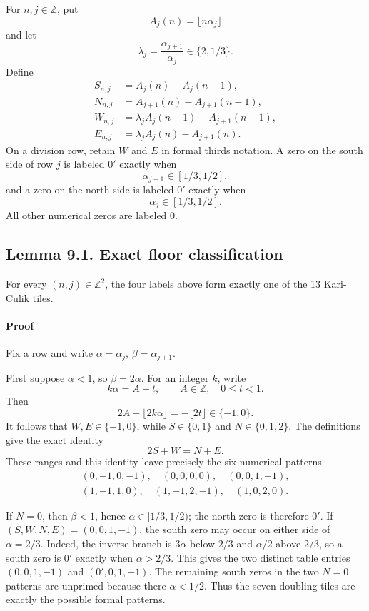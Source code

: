 \documentclass[11pt]{article}
\begin{document}
For \(n,j\in\mathbb Z\), put
\[
  A_j(n)=\lfloor n\alpha_j\rfloor
\]
and let
\[
  \lambda_j=\frac{\alpha_{j+1}}{\alpha_j}\in\{2,1/3\}.
\]
Define
\[
\begin{aligned}
S_{n,j}&=A_j(n)-A_j(n-1),\\
N_{n,j}&=A_{j+1}(n)-A_{j+1}(n-1),\\
W_{n,j}&=\lambda_jA_j(n-1)-A_{j+1}(n-1),\\
E_{n,j}&=\lambda_jA_j(n)-A_{j+1}(n).
\end{aligned}
\]
On a division row, retain \(W\) and \(E\) in formal thirds notation. A zero
on the south side of row \(j\) is labeled \(0'\) exactly when
\[
  \alpha_{j-1}\in[1/3,1/2],
\]
and a zero on the north side is labeled \(0'\) exactly when
\[
  \alpha_j\in[1/3,1/2].
\]
All other numerical zeros are labeled \(0\).

\subsection*{Lemma 9.1. Exact floor classification}

For every \((n,j)\in\mathbb Z^2\), the four labels above form exactly one of
the 13 Kari-Culik tiles.

\paragraph{Proof}

Fix a row and write \(\alpha=\alpha_j\),
\(\beta=\alpha_{j+1}\).

First suppose \(\alpha<1\), so \(\beta=2\alpha\). For an integer \(k\), write
\[
  k\alpha=A+t,\qquad A\in\mathbb Z,\quad 0\leq t<1.
\]
Then
\[
  2A-\lfloor2k\alpha\rfloor=-\lfloor2t\rfloor\in\{-1,0\}.
\]
It follows that \(W,E\in\{-1,0\}\), while \(S\in\{0,1\}\) and
\(N\in\{0,1,2\}\). The definitions give the exact identity
\[
  2S+W=N+E.
\]
These ranges and this identity leave precisely the six numerical patterns
\[
\begin{gathered}
(0,-1,0,-1),\quad (0,0,0,0),\quad (0,0,1,-1),\\
(1,-1,1,0),\quad (1,-1,2,-1),\quad (1,0,2,0).
\end{gathered}
\]

If \(N=0\), then \(\beta<1\), hence
\(\alpha\in[1/3,1/2)\); the north zero is therefore \(0'\). If
\((S,W,N,E)=(0,0,1,-1)\), the south zero may occur on either side of
\(\alpha=2/3\). Indeed, the inverse branch is \(3\alpha\) below \(2/3\)
and \(\alpha/2\) above \(2/3\), so a south zero is \(0'\) exactly when
\(\alpha>2/3\). This gives the two distinct table entries
\((0,0,1,-1)\) and \((0',0,1,-1)\). The remaining south zeros in the two
\(N=0\) patterns are unprimed because there \(\alpha<1/2\). Thus the seven
doubling tiles are exactly the possible formal patterns.
\end{document}
